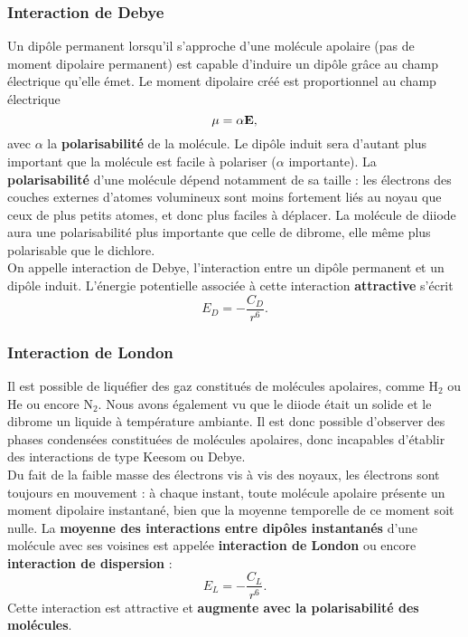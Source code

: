 \documentclass[11pt,a4paper]{report}
\begin{document}
\subsubsection{Interaction de Debye}

Un dipôle permanent lorsqu'il s'approche d'une molécule apolaire (pas de moment dipolaire permanent) est capable d'induire un dipôle grâce au champ électrique qu'elle émet. Le moment dipolaire créé est proportionnel au champ électrique
\begin{equation}
	\bold{\mu} = \alpha \bold{E},
\end{equation}
avec $\alpha$ la \textbf{polarisabilité} de la molécule. Le dipôle induit sera d'autant plus important que la molécule est facile à polariser ($\alpha$ importante). La \textbf{polarisabilité} d'une molécule dépend notamment de sa taille : les électrons des couches externes d'atomes volumineux sont moins fortement liés au noyau que ceux de plus petits atomes, et donc plus faciles à déplacer. La molécule de diiode aura une polarisabilité plus importante que celle de dibrome, elle même plus polarisable que le dichlore.\\

On appelle interaction de Debye, l'interaction entre un dipôle permanent et un dipôle induit. L'énergie potentielle associée à cette interaction \textbf{attractive} s'écrit
\begin{equation}
	E_D = -\frac{C_D}{r^6}.
\end{equation} 

\subsubsection{Interaction de London}

Il est possible de liquéfier des gaz constitués de molécules apolaires, comme $\text{H}_2$ ou $\text{He}$ ou encore $\text{N}_2$. Nous avons également vu que le diiode était un solide et le dibrome un liquide à température ambiante. Il est donc possible d'observer des phases condensées constituées de molécules apolaires, donc incapables d'établir des interactions de type Keesom ou Debye.\\

Du fait de la faible masse des électrons vis à vis des noyaux, les électrons sont toujours en mouvement : à chaque instant, toute molécule apolaire présente un moment dipolaire instantané, bien que la moyenne temporelle de ce moment soit nulle. La \textbf{moyenne des interactions entre dipôles instantanés} d'une molécule avec ses voisines est appelée  \textbf{interaction de London} ou encore \textbf{interaction de dispersion} :
\begin{equation}
	E_L = -\frac{C_L}{r^6}.
\end{equation}
Cette interaction est attractive et \textbf{augmente avec la polarisabilité des molécules}.
\end{document}

